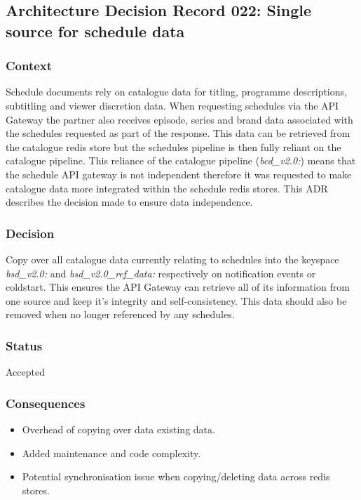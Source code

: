   \subsection*{Architecture Decision Record 022: Single source for schedule data}

  \subsubsection*{Context}
  Schedule documents rely on catalogue data for titling, programme descriptions, subtitling and viewer discretion data. When requesting 
  schedules via the API Gateway the partner also receives episode, series and brand data associated with the schedules requested as part of
  the response. This data can be retrieved from the catalogue redis store but the schedules pipeline is then fully reliant on the catalogue pipeline.
  This reliance of the catalogue pipeline (\emph{{bcd\_v2.0}:}) means that the schedule API gateway is not independent therefore it was requested to make 
  catalogue data more integrated within the schedule redis stores. This ADR describes the decision made to ensure data independence.
  \subsubsection*{Decision}
  Copy over all catalogue data currently relating to schedules into the keyspace \emph{{bsd\_v2.0}:} and \emph{{bsd\_v2.0\_ref\_data}:} respectively on 
  notification events or coldstart. This ensures the API Gateway can retrieve all of its information from one source and keep it's integrity and
  self-consistency. This data should also be removed when no longer referenced by any schedules.

  \subsubsection*{Status}
  Accepted

  \subsubsection*{Consequences}
    \begin{itemize}
      \item Overhead of copying over data existing data.
      \item Added maintenance and code complexity.
      \item Potential synchronisation issue when copying/deleting data across redis stores.
    \end{itemize}


